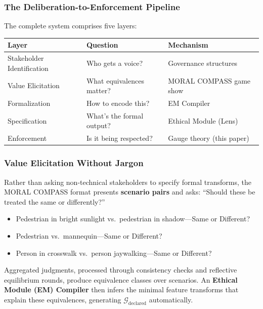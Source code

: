 \documentclass[12pt]{article}
\begin{document}
\subsubsection{The Deliberation-to-Enforcement Pipeline}

The complete system comprises five layers:

\begin{table}[h]
\centering
\begin{tabular}{lll}
\toprule
\textbf{Layer} & \textbf{Question} & \textbf{Mechanism} \\
\midrule
Stakeholder Identification & Who gets a voice? & Governance structures \\
Value Elicitation & What equivalences matter? & MORAL COMPASS game show \\
Formalization & How to encode this? & EM Compiler \\
Specification & What's the formal output? & Ethical Module (Lens) \\
Enforcement & Is it being respected? & Gauge theory (this paper) \\
\bottomrule
\end{tabular}
\end{table}

\subsubsection{Value Elicitation Without Jargon}

Rather than asking non-technical stakeholders to specify formal transforms, the MORAL COMPASS format presents \textbf{scenario pairs} and asks: ``Should these be treated the same or differently?''

\begin{itemize}
\item Pedestrian in bright sunlight vs.\ pedestrian in shadow---Same or Different?
\item Pedestrian vs.\ mannequin---Same or Different?
\item Person in crosswalk vs.\ person jaywalking---Same or Different?
\end{itemize}

Aggregated judgments, processed through consistency checks and reflective equilibrium rounds,
produce equivalence classes over scenarios. An \textbf{Ethical Module (EM) Compiler} then infers the
minimal feature transforms that explain these equivalences, generating $\mathcal{G}_{\text{declared}}$ automatically.
\end{document}
